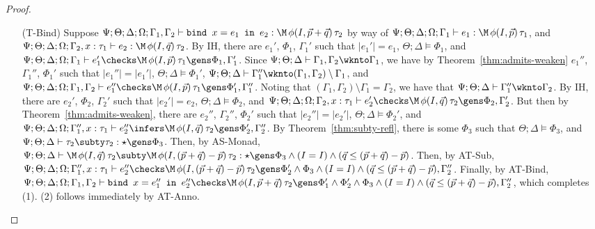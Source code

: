 \begin{proof}
\begin{itemize}
  \item[(T-Bind)] 
  Suppose $\Psi ; \Theta ; \Delta ; \Omega ; \Gamma_1,\Gamma_2 \vdash \texttt{bind } x = e_1 \texttt{ in } e_2 : \M \, \phi(I,\vec{p} + \vec{q})\, \tau_2$ by way of
  $\Psi ; \Theta ; \Delta ; \Omega ; \Gamma_1 \vdash e_1 : \M \, \phi(I,\vec{p})\, \tau_1$, and
  $\Psi ; \Theta; \Delta ; \Omega ; \Gamma_2, x:\tau_1 \vdash e_2 : \M \, \phi(I,\vec{q})\, \tau_2$.
  By IH, there are $e_1'$, $\Phi_1$, $\Gamma_1'$ such that
  $|e_1'| = e_1$,
  $\Theta ; \Delta \vDash \Phi_1$, and
  $\Psi  ; \Theta ; \Delta ; \Omega ; \Gamma_1 \vdash e_1' \checks \M \, \phi(I,\vec{p}) \, \tau_1 \gens \Phi_1,\Gamma_1'$.
  Since $\Psi ; \Theta ; \Delta \vdash \Gamma_1,\Gamma_2 \wknto \Gamma_1$,
  we have by Theorem~\ref{thm:admits-weaken} $e_1''$, $\Gamma_1''$, $\Phi_1'$ such that
  $|e_1''| = |e_1'|$,
  $\Theta ; \Delta \vDash \Phi_1'$,
  $\Psi ; \Theta ; \Delta \vdash \Gamma_1'' \wknto (\Gamma_1,\Gamma_2) \setminus \Gamma_1$, and
  $\Psi ; \Theta ; \Delta ; \Omega ; \Gamma_1,\Gamma_2 \vdash e_1'' \checks \M \, \phi(I,\vec{p}) \, \tau_1 \gens \Phi_1',\Gamma_1''$.
  Noting that $(\Gamma_1,\Gamma_2) \setminus \Gamma_1 = \Gamma_2$, we have that
  $\Psi ; \Theta ; \Delta \vdash \Gamma_1'' \wknto \Gamma_2$.
  By IH, there are $e_2'$, $\Phi_2$, $\Gamma_2'$ such that
  $|e_2'| = e_2$,
  $\Theta ; \Delta \vDash \Phi_2$, and
  $\Psi ; \Theta; \Delta ; \Omega ; \Gamma_2, x:\tau_1 \vdash e_2' \checks \M \, \phi(I,\vec{q})\, \tau_2 \gens \Phi_2,\Gamma_2'$.
  But then by Theorem~\ref{thm:admits-weaken}, there are $e_2''$, $\Gamma_2''$, $\Phi_2'$ such that
  $|e_2''| = |e_2'|$,
  $\Theta ; \Delta \vDash \Phi_2'$, and
  $\Psi ; \Theta ; \Delta ; \Omega ; \Gamma_1'', x : \tau_1 \vdash e_2'' \infers \M \, \phi(I,\vec{q}) \, \tau_2 \gens \Phi_2',\Gamma_2''$.
  By Theorem~\ref{thm:subty-refl}, there is some $\Phi_3$ such that $\Theta ; \Delta \vDash \Phi_3$, and
  $\Psi ; \Theta ; \Delta \vdash \tau_2 \subty \tau_2 : \star \gens \Phi_3$.
  Then, by AS-Monad, $\Psi ; \Theta ; \Delta \vdash \M \, \phi(I,\vec{q}) \, \tau_2 \subty \M \, \phi(I,(\vec{p} + \vec{q}) - \vec{p}) \, \tau_2 : \star \gens \Phi_3 \wedge (I = I) \wedge (\vec{q} \leq (\vec{p} + \vec{q}) - \vec{p})$.
  Then, by AT-Sub,
  $\Psi ; \Theta ; \Delta ; \Omega ; \Gamma_1'', x : \tau_1 \vdash e_2'' \checks \M \, \phi(I,(\vec{p} + \vec{q}) - \vec{p}) \, \tau_2 \gens \Phi_2' \wedge  \Phi_3 \wedge (I = I) \wedge (\vec{q} \leq (\vec{p} + \vec{q}) - \vec{p}),\Gamma_2''$.
  Finally, by AT-Bind,
  $\Psi ; \Theta ; \Delta ; \Omega ; \Gamma_1,\Gamma_2 \vdash \texttt{bind } x = e_1'' \texttt{ in } e_2'' \checks \M \, \phi(I,\vec{p} + \vec{q})\, \tau_2 \gens \Phi_1' \wedge \Phi_2' \wedge \Phi_3 \wedge (I = I) \wedge (\vec{q} \leq (\vec{p} + \vec{q}) - \vec{p}), \Gamma_2''$, which completes (1). (2) follows immediately by AT-Anno.
  

\end{itemize}
\end{proof}
